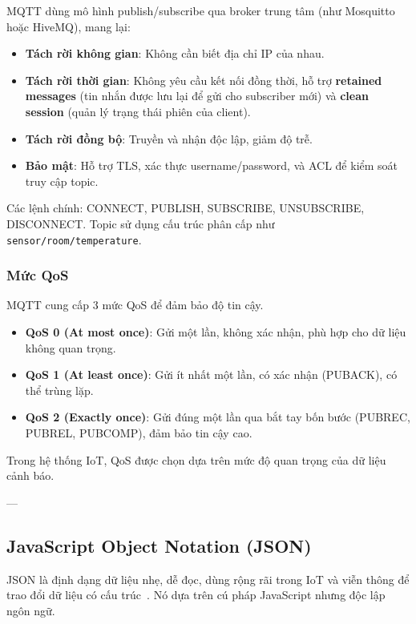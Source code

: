 MQTT dùng mô hình publish/subscribe qua broker trung tâm (như Mosquitto hoặc HiveMQ), mang lại:
\begin{itemize}
\item \textbf{Tách rời không gian}: Không cần biết địa chỉ IP của nhau.
\item \textbf{Tách rời thời gian}: Không yêu cầu kết nối đồng thời, hỗ trợ \textbf{retained messages} (tin nhắn được lưu lại để gửi cho subscriber mới) và \textbf{clean session} (quản lý trạng thái phiên của client).
\item \textbf{Tách rời đồng bộ}: Truyền và nhận độc lập, giảm độ trễ.
\item \textbf{Bảo mật}: Hỗ trợ TLS, xác thực username/password, và ACL để kiểm soát truy cập topic.
\end{itemize}

Các lệnh chính: CONNECT, PUBLISH, SUBSCRIBE, UNSUBSCRIBE, DISCONNECT. Topic sử dụng cấu trúc phân cấp như \texttt{sensor/room/temperature}.

\subsubsection{Mức QoS}
\label{subsubsec:mqtt_qos}

MQTT cung cấp 3 mức QoS để đảm bảo độ tin cậy.

\begin{itemize}
\item \textbf{QoS 0 (At most once)}: Gửi một lần, không xác nhận, phù hợp cho dữ liệu không quan trọng.
\item \textbf{QoS 1 (At least once)}: Gửi ít nhất một lần, có xác nhận (PUBACK), có thể trùng lặp.
\item \textbf{QoS 2 (Exactly once)}: Gửi đúng một lần qua bắt tay bốn bước (PUBREC, PUBREL, PUBCOMP), đảm bảo tin cậy cao.
\end{itemize}

Trong hệ thống IoT, QoS được chọn dựa trên mức độ quan trọng của dữ liệu cảnh báo.

---

\subsection{JavaScript Object Notation (JSON)}
\label{subsec:json_format}

JSON là định dạng dữ liệu nhẹ, dễ đọc, dùng rộng rãi trong IoT và viễn thông để trao đổi dữ liệu có cấu trúc~\cite{json_rfc8259}. Nó dựa trên cú pháp JavaScript nhưng độc lập ngôn ngữ.

